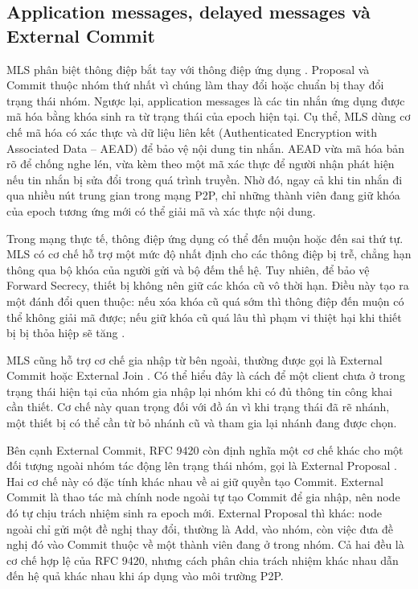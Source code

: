 \documentclass[../DoAn.tex]{subfiles}
\begin{document}
\subsection{Application messages, delayed messages và External Commit}

MLS phân biệt thông điệp bắt tay với thông điệp ứng dụng \cite{rfc9420}. Proposal và Commit thuộc nhóm thứ nhất vì chúng làm thay đổi hoặc chuẩn bị thay đổi trạng thái nhóm. Ngược lại, application messages là các tin nhắn ứng dụng được mã hóa bằng khóa sinh ra từ trạng thái của epoch hiện tại. Cụ thể, MLS dùng cơ chế mã hóa có xác thực và dữ liệu liên kết (Authenticated Encryption with Associated Data -- AEAD) \cite{rfc5116} để bảo vệ nội dung tin nhắn. AEAD vừa mã hóa bản rõ để chống nghe lén, vừa kèm theo một mã xác thực để người nhận phát hiện nếu tin nhắn bị sửa đổi trong quá trình truyền. Nhờ đó, ngay cả khi tin nhắn đi qua nhiều nút trung gian trong mạng P2P, chỉ những thành viên đang giữ khóa của epoch tương ứng mới có thể giải mã và xác thực nội dung.

Trong mạng thực tế, thông điệp ứng dụng có thể đến muộn hoặc đến sai thứ tự. MLS có cơ chế hỗ trợ một mức độ nhất định cho các thông điệp bị trễ, chẳng hạn thông qua bộ khóa của người gửi và bộ đếm thế hệ. Tuy nhiên, để bảo vệ Forward Secrecy, thiết bị không nên giữ các khóa cũ vô thời hạn. Điều này tạo ra một đánh đổi quen thuộc: nếu xóa khóa cũ quá sớm thì thông điệp đến muộn có thể không giải mã được; nếu giữ khóa cũ quá lâu thì phạm vi thiệt hại khi thiết bị bị thỏa hiệp sẽ tăng \cite{rfc9420}.

MLS cũng hỗ trợ cơ chế gia nhập từ bên ngoài, thường được gọi là External Commit hoặc External Join \cite{rfc9420}. Có thể hiểu đây là cách để một client chưa ở trong trạng thái hiện tại của nhóm gia nhập lại nhóm khi có đủ thông tin công khai cần thiết. Cơ chế này quan trọng đối với đồ án vì khi trạng thái đã rẽ nhánh, một thiết bị có thể cần từ bỏ nhánh cũ và tham gia lại nhánh đang được chọn.

Bên cạnh External Commit, RFC 9420 còn định nghĩa một cơ chế khác cho một đối tượng ngoài nhóm tác động lên trạng thái nhóm, gọi là External Proposal \cite{rfc9420}. Hai cơ chế này có đặc tính khác nhau về ai giữ quyền tạo Commit. External Commit là thao tác mà chính node ngoài tự tạo Commit để gia nhập, nên node đó tự chịu trách nhiệm sinh ra epoch mới. External Proposal thì khác: node ngoài chỉ gửi một đề nghị thay đổi, thường là Add, vào nhóm, còn việc đưa đề nghị đó vào Commit thuộc về một thành viên đang ở trong nhóm. Cả hai đều là cơ chế hợp lệ của RFC 9420, nhưng cách phân chia trách nhiệm khác nhau dẫn đến hệ quả khác nhau khi áp dụng vào môi trường P2P.
\end{document}
